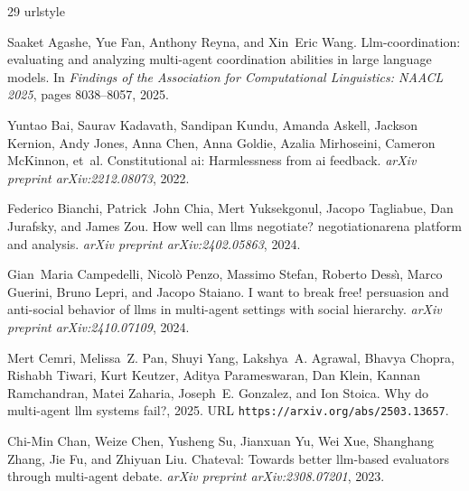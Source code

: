 \begin{thebibliography}{29}
\providecommand{\natexlab}[1]{#1}
\providecommand{\url}[1]{\texttt{#1}}
\expandafter\ifx\csname urlstyle\endcsname\relax
  \providecommand{\doi}[1]{doi: #1}\else
  \providecommand{\doi}{doi: \begingroup \urlstyle{rm}\Url}\fi

Saaket Agashe, Yue Fan, Anthony Reyna, and Xin~Eric Wang.
\newblock Llm-coordination: evaluating and analyzing multi-agent coordination abilities in large language models.
\newblock In \emph{Findings of the Association for Computational Linguistics: NAACL 2025}, pages 8038--8057, 2025.

Yuntao Bai, Saurav Kadavath, Sandipan Kundu, Amanda Askell, Jackson Kernion, Andy Jones, Anna Chen, Anna Goldie, Azalia Mirhoseini, Cameron McKinnon, et~al.
\newblock Constitutional ai: Harmlessness from ai feedback.
\newblock \emph{arXiv preprint arXiv:2212.08073}, 2022.

Federico Bianchi, Patrick~John Chia, Mert Yuksekgonul, Jacopo Tagliabue, Dan Jurafsky, and James Zou.
\newblock How well can llms negotiate? negotiationarena platform and analysis.
\newblock \emph{arXiv preprint arXiv:2402.05863}, 2024.

Gian~Maria Campedelli, Nicol{\`o} Penzo, Massimo Stefan, Roberto Dess{\`\i}, Marco Guerini, Bruno Lepri, and Jacopo Staiano.
\newblock I want to break free! persuasion and anti-social behavior of llms in multi-agent settings with social hierarchy.
\newblock \emph{arXiv preprint arXiv:2410.07109}, 2024.

Mert Cemri, Melissa~Z. Pan, Shuyi Yang, Lakshya~A. Agrawal, Bhavya Chopra, Rishabh Tiwari, Kurt Keutzer, Aditya Parameswaran, Dan Klein, Kannan Ramchandran, Matei Zaharia, Joseph~E. Gonzalez, and Ion Stoica.
\newblock Why do multi-agent llm systems fail?, 2025.
\newblock URL \url{https://arxiv.org/abs/2503.13657}.

Chi-Min Chan, Weize Chen, Yusheng Su, Jianxuan Yu, Wei Xue, Shanghang Zhang, Jie Fu, and Zhiyuan Liu.
\newblock Chateval: Towards better llm-based evaluators through multi-agent debate.
\newblock \emph{arXiv preprint arXiv:2308.07201}, 2023.


\end{thebibliography}
